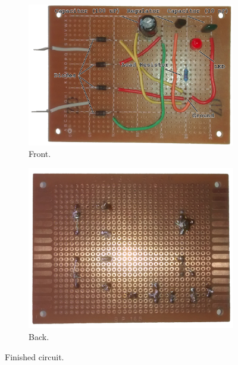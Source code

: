 \documentclass[12pt]{article}
\begin{document}
\begin{figure}[h!]
\centering
\begin{subfigure}[b]{0.45\textwidth}
\includegraphics[width=\textwidth]{pcb_front}
\caption{Front.}
\label{fig:front}
\end{subfigure}
\qquad
\begin{subfigure}[b]{0.41\textwidth}
\includegraphics[width=\textwidth]{pcb_back}
\caption{Back.}
\label{fig:back}
\end{subfigure}
\caption{Finished circuit.}
\label{fig:pcb}
\end{figure}
\end{document}
